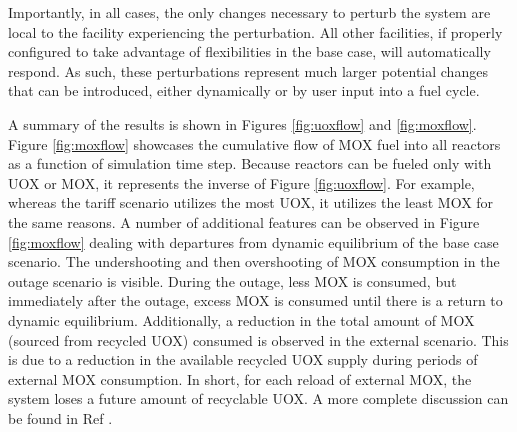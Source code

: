 Importantly, in all cases, the only changes necessary to perturb the system
are local to the facility experiencing the perturbation.  All other
facilities, if properly configured to take advantage of flexibilities in the
base case, will automatically respond.  As such, these perturbations represent
much larger potential changes that can be introduced, either dynamically or by
user input into a fuel cycle.

A summary of the results is shown in Figures \ref{fig:uoxflow} and
\ref{fig:moxflow}.  Figure \ref{fig:moxflow} showcases the cumulative flow of
MOX fuel into all reactors as a function of simulation time step. Because
reactors can be fueled only with UOX or MOX, it represents the inverse of
Figure \ref{fig:uoxflow}. For example, whereas the tariff scenario utilizes
the most UOX, it utilizes the least MOX for the same reasons. A number of
additional features can be observed in Figure \ref{fig:moxflow} dealing with
departures from dynamic equilibrium of the base case scenario. The
undershooting and then overshooting of MOX consumption in the outage scenario
is visible. During the outage, less MOX is consumed, but immediately after the
outage, excess MOX is consumed until there is a return to dynamic
equilibrium. Additionally, a reduction in the total amount of MOX (sourced
from recycled UOX) consumed is observed in the external scenario. This is due
to a reduction in the available recycled UOX supply during periods of external
MOX consumption. In short, for each reload of external MOX, the system loses a
future amount of recyclable UOX.  A more complete discussion can be found in
Ref \cite{dre_paper}.

